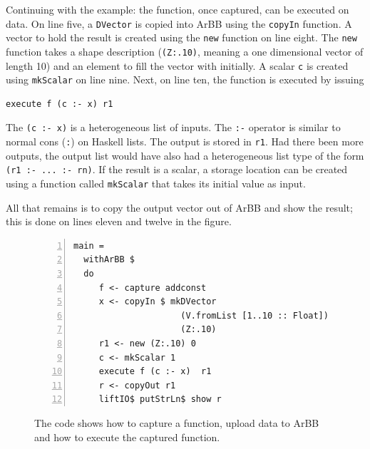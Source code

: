 
Continuing with the example: the function, once captured, can be executed 
on data. On line five, a {\tt DVector} is copied into ArBB using the {\tt copyIn} function. 
A vector to hold the result is created using the {\tt new} function on line eight. The 
{\tt new} function takes a shape description ({\tt (Z:.10)}, meaning a one dimensional 
vector of length 10) and an element to fill the vector with initially.
A scalar {\tt c} is created using {\tt mkScalar} on line nine. Next, on line ten, the 
function is executed by issuing 
\begin{verbatim}
execute f (c :- x) r1
\end{verbatim}
The {\tt (c :- x)} is a heterogeneous list of inputs. 
The {\tt :-} operator is similar to normal cons ({\tt :}) on Haskell lists.  
The output is stored in {\tt r1}. Had there been more outputs, the output
list would have also had a heterogeneous list type of the form
{\tt (r1 :- ... :- rn)}. If the result is a 
scalar, a storage location can be created using a function called 
{\tt mkScalar} that takes its initial value as input. 

All that remains is to copy the output vector out of ArBB and show the result; this 
is done on lines eleven and twelve in the figure.  

\begin{figure}
\begin{Verbatim}[numbers=left,frame=single] 
main = 
  withArBB $ 
  do 
     f <- capture addconst             
     x <- copyIn $ mkDVector 
                     (V.fromList [1..10 :: Float]) 
                     (Z:.10)
     r1 <- new (Z:.10) 0 
     c <- mkScalar 1      
     execute f (c :- x)  r1              
     r <- copyOut r1              
     liftIO$ putStrLn$ show r
\end{Verbatim}
\caption{The code shows how to capture a function, upload data to ArBB and 
         how to execute the captured function.}
\label{fig:EmbArBBcode1}
\end{figure}  

